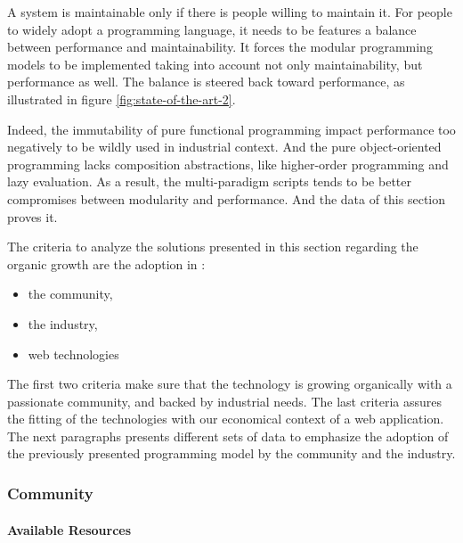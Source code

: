 A system is maintainable only if there is people willing to maintain it.
For people to widely adopt a programming language, it needs to be features a balance between performance and maintainability.
It forces the modular programming models to be implemented taking into account not only maintainability, but performance as well.
The balance is steered back toward performance, as illustrated in figure \ref{fig:state-of-the-art-2}.

Indeed, the immutability of pure functional programming impact performance too negatively to be wildly used in industrial context.
And the pure object-oriented programming lacks composition abstractions, like higher-order programming and lazy evaluation.
As a result, the multi-paradigm scripts tends to be better compromises between modularity and performance.
And the data of this section proves it.

The criteria to analyze the solutions presented in this section regarding the organic growth are the adoption in :
\begin{itemize}
\item the community,
\item the industry,
\item web technologies
\end{itemize}
The first two criteria make sure that the technology is growing organically with a passionate community, and backed by industrial needs.
The last criteria assures the fitting of the technologies with our economical context of a web application. 
The next paragraphs presents different sets of data to emphasize the adoption of the previously presented programming model by the community and the industry.


\subsubsection{Community}

\paragraph{Available Resources}

